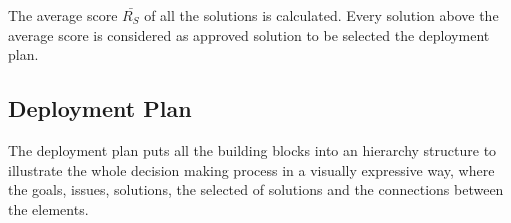 The average score $\bar{R_{S}}$ of all the solutions is calculated. Every solution above the average score is considered as approved solution to be selected the deployment plan.


\subsection{Deployment Plan}
The deployment plan puts all the building blocks into an hierarchy structure to illustrate the whole decision making process in a visually expressive way, where the goals, issues, solutions, the selected of solutions and the connections between the elements.





